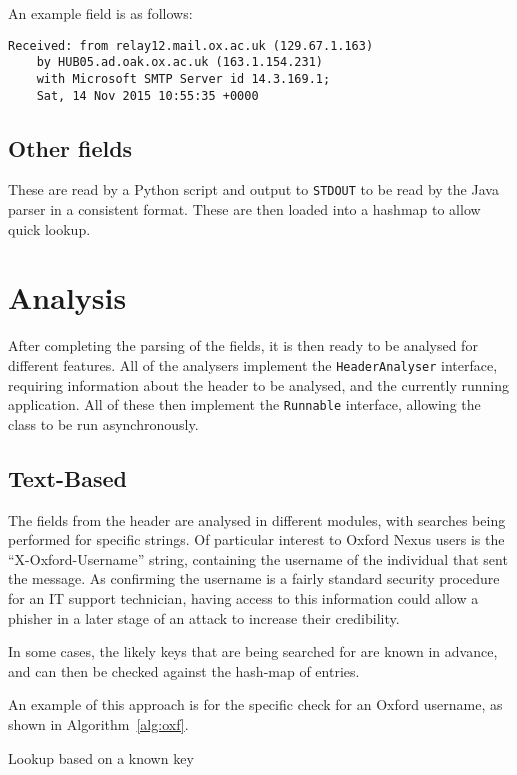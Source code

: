 An example field is as follows:
\begin{verbatim}
Received: from relay12.mail.ox.ac.uk (129.67.1.163)
    by HUB05.ad.oak.ox.ac.uk (163.1.154.231)
    with Microsoft SMTP Server id 14.3.169.1;
    Sat, 14 Nov 2015 10:55:35 +0000
\end{verbatim}
\subsection{Other fields}

These are read by a Python script and output to \texttt{STDOUT} to be read by
the Java parser in a consistent format.  These are then loaded into a hashmap to
allow quick lookup.

\section{Analysis}

After completing the parsing of the fields, it is then ready to be analysed for
different features.  All of the analysers implement the \texttt{HeaderAnalyser}
interface, requiring information about the header to be analysed, and the
currently running application.  All of these then implement the
\texttt{Runnable} interface, allowing the class to be run asynchronously.

\subsection{Text-Based}

The fields from the header are analysed in different modules, with searches
being performed for specific strings.  Of particular interest to Oxford Nexus
users is the ``X-Oxford-Username'' string, containing the username of the
individual that sent the message.  As confirming the username is a fairly
standard security procedure for an IT support technician, having access to this
information could allow a phisher in a later stage of an attack to increase
their credibility.

In some cases, the likely keys that are being searched for are known in advance,
and can then be checked against the hash-map of entries.

An example of this approach is for the specific check for an Oxford username, as shown in Algorithm~\ref{alg:oxf}.

\begin{algorithm}
	\caption{Lookup based on a known key}
	\label{alg:oxf}
\end{algorithm}

